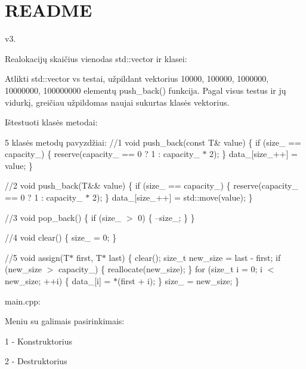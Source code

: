 \chapter{README}
\hypertarget{md__r_e_a_d_m_e}{}\label{md__r_e_a_d_m_e}
v3.

Realokacijų skaičius vienodas std\+::vector ir  klasei\+: 

Atlikti std\+::vector vs  testai, užpildant vektorius 10000, 100000, 1000000, 10000000, 100000000 elementų push\+\_\+back() funkcija. Pagal visus testus ir jų vidurkį, greičiau užpildomas naujai sukurtas  klasės vektorius. 

    



Ištestuoti  klasės metodai\+:





5  klasės metodų pavyzdžiai\+: //1 void push\+\_\+back(const T\& value) \{ if (size\+\_\+ == capacity\+\_\+) \{ reserve(capacity\+\_\+ == 0 ? 1 \+: capacity\+\_\+ \texorpdfstring{$\ast$}{*} 2); \} data\+\_\+\mbox{[}size\+\_\+++\mbox{]} = value; \}

//2 void push\+\_\+back(\+T\&\& value) \{ if (size\+\_\+ == capacity\+\_\+) \{ reserve(capacity\+\_\+ == 0 ? 1 \+: capacity\+\_\+ \texorpdfstring{$\ast$}{*} 2); \} data\+\_\+\mbox{[}size\+\_\+++\mbox{]} = std\+::move(value); \}

//3 void pop\+\_\+back() \{ if (size\+\_\+ \texorpdfstring{$>$}{>} 0) \{ --size\+\_\+; \} \}

//4 void clear() \{ size\+\_\+ = 0; \}

//5 void assign(\+T\texorpdfstring{$\ast$}{*} first, T\texorpdfstring{$\ast$}{*} last) \{ clear(); size\+\_\+t new\+\_\+size = last -\/ first; if (new\+\_\+size \texorpdfstring{$>$}{>} capacity\+\_\+) \{ reallocate(new\+\_\+size); \} for (size\+\_\+t i = 0; i \texorpdfstring{$<$}{<} new\+\_\+size; ++i) \{ data\+\_\+\mbox{[}i\mbox{]} = \texorpdfstring{$\ast$}{*}(first + i); \} size\+\_\+ = new\+\_\+size; \}

main.\+cpp\+:

Meniu su galimais pasirinkimais\+:

1 -\/ Konstruktorius 

2 -\/ Destruktorius



